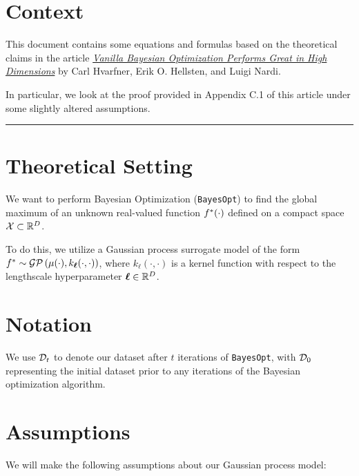 \documentclass[11pt]{article}
\numberwithin{figure}{section}
\numberwithin{equation}{section}
\newcommand{\bs}[1]{\boldsymbol{#1}}
\def\bell{\bs{\ell}}
\def\BayesOpt{\texttt{BayesOpt}}
\def\calGP{\mathcal{GP}}
\begin{document}
\section{Context}

This document contains some equations and formulas based on the theoretical claims in the article \href{https://arxiv.org/abs/2402.02229}{\textit{Vanilla Bayesian Optimization Performs Great in High Dimensions}} by Carl Hvarfner, Erik O. Hellsten, and Luigi Nardi.

In particular, we look at the proof provided in Appendix C.1 of this article under some slightly altered assumptions.

\noindent\rule{\textwidth}{0.8pt}

\section{Theoretical Setting}

We want to perform Bayesian Optimization (\BayesOpt{}) to find the global maximum of an unknown real-valued function $f^{*}(\cdot)$ defined on a compact space $\mathcal{X} \subset \mathbb{R}^{D}$.

To do this, we utilize a Gaussian process surrogate model of the form $\fstar \sim \calGP\left(\mu(\cdot), k_{\bell}(\cdot, \cdot)\right)$, where $k_{\bell}(\cdot, \cdot)$ is a kernel function with respect to the lengthscale hyperparameter $\bell \in \bbR^{D}$.

\section{Notation}

We use $\mathcal{D}_{t}$ to denote our dataset after $t$ iterations of \BayesOpt{}, with $\mathcal{D}_{0}$ representing the initial dataset prior to any iterations of the Bayesian optimization algorithm. 

\section{Assumptions}

We will make the following assumptions about our Gaussian process model:
\end{document}
